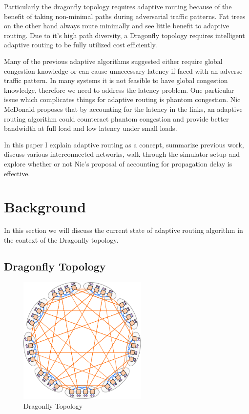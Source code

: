 \documentclass[conference,12pt]{IEEEtran}
\begin{document}
Particularly the dragonfly topology requires adaptive routing because of the benefit of taking non-minimal paths during adversarial traffic patterns. Fat trees on the other hand always route minimally and see little benefit to adaptive routing. Due to it's high path diversity, a Dragonfly topology requires intelligent adaptive routing to be fully utilized cost efficiently.   

Many of the previous adaptive algorithms suggested either require global congestion knowledge or can cause unnecessary latency if faced with an adverse traffic pattern. In many systems it is not feasible to have global congestion knowledge, therefore we need to address the latency problem. One particular issue which complicates things for adaptive routing is phantom congestion. Nic McDonald proposes that by accounting for the latency in the links, an adaptive routing algorithm could counteract phantom congestion and provide better bandwidth at full load and low latency under small loads. 

In this paper I explain adaptive routing as a concept, summarize previous work, discuss various interconnected networks, walk through the simulator setup and explore whether or not Nic's proposal of accounting for propagation delay is effective.


\section{Background}

In this section we will discuss the current state of adaptive routing algorithm in the context of the Dragonfly topology.

\subsection{Dragonfly Topology}

\begin{figure}[ht]
  \begin{center}
    \includegraphics[width=2.5in,height=2.5in]{figures/Dragonfly-topology.png}
  \end{center}
   \vspace{-0.25in}
 \caption[Dragonfly Topology]{Dragonfly Topology}
 \label{fig:DragonFly}
\end{figure}
\end{document}
